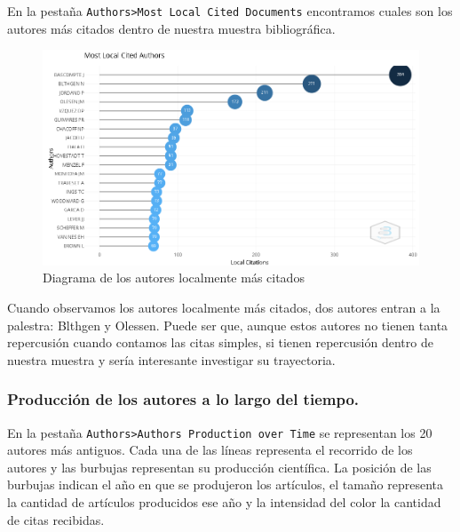 \documentclass[
]{article}
\begin{document}
En la pestaña
\texttt{Authors\textgreater{}Most\ Local\ Cited\ Documents} encontramos
cuales son los autores más citados dentro de nuestra muestra
bibliográfica.

\begin{figure}
\centering
\includegraphics{MostLocalCitedAuthors.png}
\caption{Diagrama de los autores localmente más citados}
\end{figure}

Cuando observamos los autores localmente más citados, dos autores entran
a la palestra: Blthgen y Olessen. Puede ser que, aunque estos autores no
tienen tanta repercusión cuando contamos las citas simples, si tienen
repercusión dentro de nuestra muestra y sería interesante investigar su
trayectoria.

\hypertarget{producciuxf3n-de-los-autores-a-lo-largo-del-tiempo.}{%
\subsubsection{Producción de los autores a lo largo del
tiempo.}\label{producciuxf3n-de-los-autores-a-lo-largo-del-tiempo.}}

En la pestaña
\texttt{Authors\textgreater{}Author\textquotesingle{}s\ Production\ over\ Time}
se representan los 20 autores más antiguos. Cada una de las líneas
representa el recorrido de los autores y las burbujas representan su
producción científica. La posición de las burbujas indican el año en que
se produjeron los artículos, el tamaño representa la cantidad de
artículos producidos ese año y la intensidad del color la cantidad de
citas recibidas.
\end{document}
